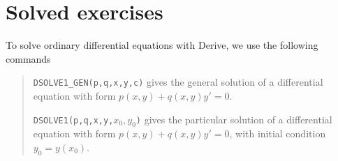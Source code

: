 % 
% 
% 

\section{Solved exercises}
\begin{indication}
To solve ordinary differential equations with Derive, we use the following commands
\begin{quote}
\texttt{DSOLVE1\_GEN(p,q,x,y,c)} gives the general solution of a differential equation with form $p(x,y)+q(x,y)y'=0$.

\texttt{DSOLVE1(p,q,x,y,$x_{0},y_{0}$)} gives the particular solution of a differential equation with form $p(x,y)+q(x,y)y'=0$, with initial condition $y_{0}=y(x_{0})$.
\end{quote}
\end{indication}

